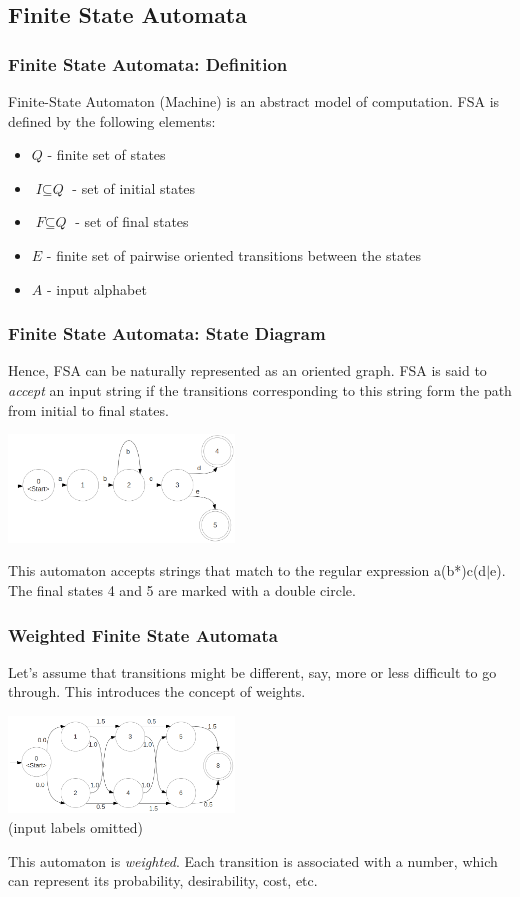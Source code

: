 \documentclass{beamer}
\newcommand{\<}{\langle}
\renewcommand{\>}{\rangle}
\begin{document}
\subsection{Finite State Automata}
\begin{frame}
  \frametitle{Finite State Automata: Definition}

Finite-State Automaton (Machine) is an abstract model of computation. FSA is defined by the following elements:

      \begin{itemize}
      \item $\textit{Q}$ - finite set of states
      \item $\textit{I}\subseteq\textit{Q}$ - set of initial states
      \item $\textit{F}\subseteq\textit{Q}$ - set of final states
      \item $\textit{E}$ - finite set of pairwise oriented transitions between the states
      \item $\textit{A}$ - input alphabet
      \end{itemize}
\end{frame}
\begin{frame}
  \frametitle{Finite State Automata: State Diagram}

Hence, FSA can be naturally represented as an oriented graph. FSA is said to \textit{accept} an input string if the transitions corresponding to this string form the path from initial to final states.
\begin{center}
\includegraphics[width=6cm]{fsa-regexp-1.png}\\
\end{center}
This automaton accepts strings that match to the regular expression a(b*)c(d$\mid$e). The final states 4 and 5 are marked with a double circle.
\end{frame}
\begin{frame}
  \frametitle{Weighted Finite State Automata}

Let's assume that transitions might be different, say, more or less difficult to go through. This introduces the concept of weights.
\begin{center}
\includegraphics[width=6cm]{fsa-weights-2.png}\\
(input labels omitted)
\end{center}
This automaton is \textit{weighted}. Each transition is associated with a number, which can represent its probability, desirability, cost, etc.
\end{frame}
\end{document}
